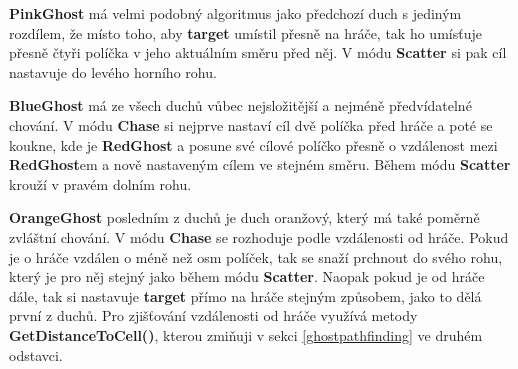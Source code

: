 \documentclass[a4]{article}
\begin{document}
\textbf{PinkGhost} má velmi podobný algoritmus jako předchozí duch s jediným rozdílem, že místo toho, aby \textbf{target} umístil přesně na hráče, tak ho umísťuje přesně čtyři políčka v jeho aktuálním směru před něj. V módu \textbf{Scatter} si pak cíl nastavuje do levého horního rohu.

\textbf{BlueGhost} má ze všech duchů vůbec nejsložitější a nejméně předvídatelné chování. V módu \textbf{Chase} si nejprve nastaví cíl dvě políčka před hráče a poté se koukne, kde je \textbf{RedGhost} a posune své cílové políčko přesně o vzdálenost mezi \textbf{RedGhost}em a nově nastaveným cílem ve stejném směru. Během módu \textbf{Scatter} krouží v pravém dolním rohu.

\textbf{OrangeGhost} posledním z duchů je duch oranžový, který má také poměrně zvláštní chování. V módu \textbf{Chase} se rozhoduje podle vzdálenosti od hráče. Pokud je o hráče vzdálen o méně než osm políček, tak se snaží prchnout do svého rohu, který je pro něj stejný jako během módu \textbf{Scatter}. Naopak pokud je od hráče dále, tak si nastavuje \textbf{target} přímo na hráče stejným způsobem, jako to dělá první z duchů. Pro zjišťování vzdálenosti od hráče využívá metody \textbf{GetDistanceToCell()}, kterou zmiňuji v sekci \ref{ghostpathfinding} ve druhém odstavci.
\end{document}
